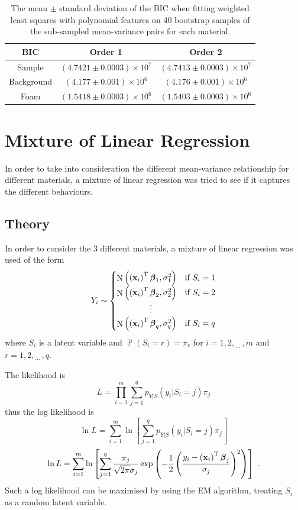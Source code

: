 \documentclass[12pt]{report}
\DeclareMathOperator{\prob}{\mathbb{P}}
\DeclareMathOperator{\normal}{N}
\newcommand{\T}{^\textup{T}}
\newcommand{\dotdotdot}{_{\phantom{.}\cdots}}
\newcommand{\vect}[1]{\mathbf{#1}}
\newcommand{\vectGreek}[1]{\boldsymbol{#1}}
\begin{document}
\begin{table}
	\centering
	\begin{tabular}{ c | c c  }
		BIC & Order 1 & Order 2 \\
		\hline
		Sample & $(4.7421\pm0.0003)\times 10^7$ & $(4.7413\pm0.0003)\times 10^7$ \\
		Background & $(4.177\pm0.001)\times 10^6$ & $(4.176\pm0.001)\times 10^6$ \\
		Foam & $(1.5418\pm0.0003)\times 10^6$ & $(1.5403\pm0.0003)\times 10^6$
	\end{tabular}
	\caption{The mean $\pm$ standard deviation of the BIC when fitting weighted least squares with polynomial features on 40 bootstrap samples of the sub-sampled mean-variance pairs for each material.}
	\label{table:subsample_BIC}
\end{table}

\section{Mixture of Linear Regression}

In order to take into consideration the different mean-variance relationship for different materials, a mixture of linear regression was tried to see if it captures the different behaviours.

\subsection{Theory}
In order to consider the 3 different materials, a mixture of linear regression was used of the form
\begin{equation}
Y_i\sim
\begin{cases}
\normal\left(\left(\vect{x}_i\right)\T\vectGreek{\beta}_1,\sigma_1^2\right) & \text{if }S_i=1\\ 
\normal\left(\left(\vect{x}_i\right)\T\vectGreek{\beta}_2,\sigma_2^2\right) & \text{if }S_i=2\\
\qquad\qquad\vdots\\
\normal\left(\left(\vect{x}_i\right)\T\vectGreek{\beta}_q,\sigma_q^2\right) & \text{if }S_i=q\\
\end{cases}
\end{equation}
where $S_i$ is a latent variable and $\prob\left(S_i=r\right)=\pi_r$ for $i=1,2,\dotdotdot,m$ and $r=1,2,\dotdotdot,q$.

The likelihood is
\begin{equation*}
L=\prod_{i=1}^m\sum_{j=1}^qp_{Y|S}\left(y_i|S_i=j\right)\pi_j
\end{equation*}
thus the log likelihood is
\begin{equation*}
\ln{L}=\sum_{i=1}^m\ln\left[
\sum_{j=1}^qp_{Y|S}\left(y_i|S_i=j\right)\pi_j
\right]
\end{equation*}
\begin{equation}
\ln{L}=\sum_{i=1}^m\ln\left[
\sum_{j=1}^q \frac{\pi_j}{\sqrt{2\pi}\sigma_j}\exp\left(-\frac{1}{2}\left(\frac{y_i-\left(\vect{x}_i\right)\T\vectGreek{\beta}_j}{\sigma_j}\right)^2\right) 
\right] \ .
\end{equation}
Such a log likelihood can be maximised by using the EM algorithm, treating $S_i$ as a random latent variable.
\end{document}
